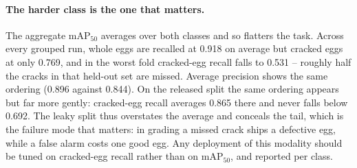 \paragraph{The harder class is the one that matters.} The aggregate mAP$_{50}$ averages over both
classes and so flatters the task. Across every grouped run, whole eggs are recalled at
0.918 on average but cracked eggs at only 0.769, and in the worst fold cracked-egg recall
falls to 0.531 -- roughly half the cracks in that held-out set are missed. Average precision
shows the same ordering (0.896 against 0.844). On the released split the same ordering
appears but far more gently: cracked-egg recall averages 0.865 there and never falls below
0.692. The leaky split thus overstates the average and conceals the tail, which is the
failure mode that matters: in grading a missed crack ships a defective egg, while a false
alarm costs one good egg. Any deployment of this modality should be tuned on cracked-egg
recall rather than on mAP$_{50}$, and reported per class.
